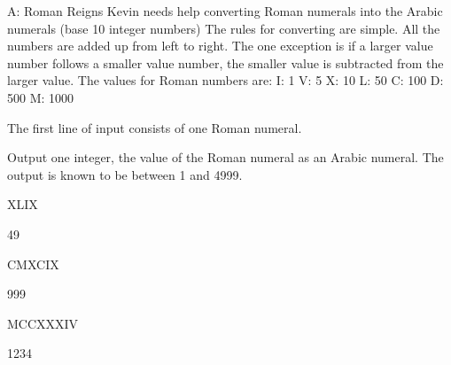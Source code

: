 \begin{problem}{A: Roman Reigns}
Kevin needs help converting Roman numerals into the Arabic numerals (base 10 integer numbers)
The rules for converting are simple. All the numbers are added up from left to right.
The one exception is if a larger value number follows a smaller value number, the smaller value is subtracted from the larger value.
The values for Roman numbers are:
I: 1
V: 5
X: 10
L: 50
C: 100
D: 500
M: 1000

\end{problem}

\begin{formalin}
The first line of input consists of one Roman numeral. 
\end{formalin}

\begin{formalout}
Output one integer, the value of the Roman numeral as an Arabic numeral.
The output is known to be between 1 and 4999.
\end{formalout}

\begin{datain}
XLIX
\end{datain}
\begin{dataout}
49
\end{dataout}

\begin{datain}
CMXCIX
\end{datain}
\begin{dataout}
999
\end{dataout}

\begin{datain}
MCCXXXIV
\end{datain}
\begin{dataout}
1234
\end{dataout}
